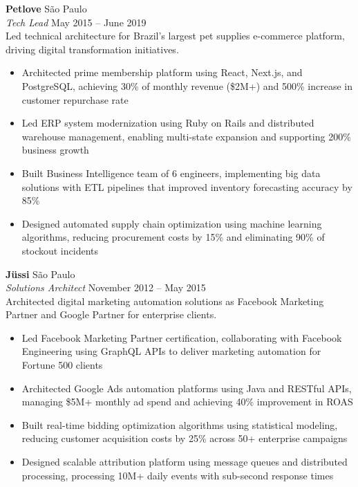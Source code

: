 \documentclass[a4paper]{article}
\begin{document}
\textbf{Petlove}                               \hfill São Paulo             \\
\textit{Tech Lead}                             \hfill May 2015 – June 2019   \\
\vspace{0.5mm}
Led technical architecture for Brazil's largest pet supplies e-commerce platform, driving digital transformation initiatives.
\vspace{-2mm}
\begin{itemize}
\setlength\itemsep{-1mm}
\item Architected prime membership platform using React, Next.js, and PostgreSQL, achieving 30\% of monthly revenue (\$2M+) and 500\% increase in customer repurchase rate
\item Led ERP system modernization using Ruby on Rails and distributed warehouse management, enabling multi-state expansion and supporting 200\% business growth
\item Built Business Intelligence team of 6 engineers, implementing big data solutions with ETL pipelines that improved inventory forecasting accuracy by 85\%
\item Designed automated supply chain optimization using machine learning algorithms, reducing procurement costs by 15\% and eliminating 90\% of stockout incidents
\end{itemize}
\vspace{0.5mm}

\textbf{Jüssi}                                 \hfill São Paulo         \\
\textit{Solutions Architect} \hfill November 2012 – May 2015                 \\
\vspace{0.5mm}
Architected digital marketing automation solutions as Facebook Marketing Partner and Google Partner for enterprise clients.
\vspace{-2mm}
\begin{itemize}
\setlength\itemsep{-1mm}
\item Led Facebook Marketing Partner certification, collaborating with Facebook Engineering using GraphQL APIs to deliver marketing automation for Fortune 500 clients
\item Architected Google Ads automation platforms using Java and RESTful APIs, managing \$5M+ monthly ad spend and achieving 40\% improvement in ROAS
\item Built real-time bidding optimization algorithms using statistical modeling, reducing customer acquisition costs by 25\% across 50+ enterprise campaigns
\item Designed scalable attribution platform using message queues and distributed processing, processing 10M+ daily events with sub-second response times
\end{itemize}
\vspace{0.5mm}
\end{document}
